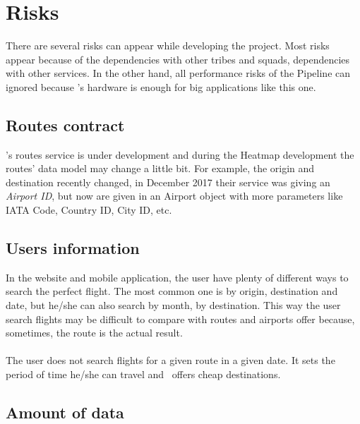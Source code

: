 
\section{Risks}

There are several risks can appear while developing the project. Most risks appear because of the dependencies with other tribes and squads, dependencies with other services. In the other hand, all performance risks of the Pipeline can ignored because \company's hardware is enough for big applications like this one.

\subsection{Routes contract}

\squad's routes service is under development and during the Heatmap development the routes' data model may change a little bit. For example, the origin and destination recently changed, in December 2017 their service was giving an \textit{Airport ID}, but now are given in an Airport object with more parameters like IATA Code\cite{iata_code}, Country ID, City ID, etc.

\subsection{Users information}

In the website and mobile application, the user have plenty of different ways to search the perfect flight. The most common one is by origin, destination and date, but he/she can also search by month, by destination. This way the user search flights may be difficult to compare with routes and airports offer because, sometimes, the route is the actual result.
\\\\
The user does not search flights for a given route in a given date. It sets the period of time he/she can travel and \company\ offers cheap destinations.

\subsection{Amount of data}

